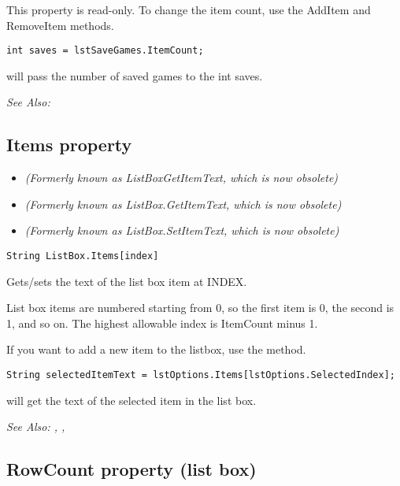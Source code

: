 This property is read-only. To change the item count, use the AddItem and RemoveItem methods.

\begin{verbatim}
int saves = lstSaveGames.ItemCount;
\end{verbatim}
will pass the number of saved games to the int saves.

\it{See Also:} 


\subsection{Items property}\label{ListBox.Items}%

\begin{itemize}
\item \it{(Formerly known as ListBoxGetItemText, which is now obsolete)}
\item \it{(Formerly known as ListBox.GetItemText, which is now obsolete)}
\item \it{(Formerly known as ListBox.SetItemText, which is now obsolete)}
\end{itemize}

\begin{verbatim}
String ListBox.Items[index]
\end{verbatim}
Gets/sets the text of the list box item at INDEX.

List box items are numbered starting from 0, so the first item is 0, the
second is 1, and so on. The highest allowable index is ItemCount minus 1.

If you want to add a new item to the listbox, use the  method.

\begin{verbatim}
String selectedItemText = lstOptions.Items[lstOptions.SelectedIndex];
\end{verbatim}
will get the text of the selected item in the list box.

\it{See Also:} ,
,


\subsection{RowCount property (list box)}\label{ListBox.RowCount}%

